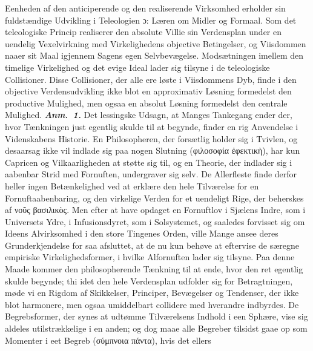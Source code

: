 \documentclass[12pt]{book}
\newcommand{\anm}[1]{\emph{\textbf{Anm.~#1.}}}
\newcommand{\dsi}{\textup{ɔ:}}
\newcommand{\opage}[1]{\marginnote{\footnotesize\textit{[#1]}}}
\begin{document}
Eenheden af den anticiperende og den realiserende Virksomhed erholder sin fuldstændige
Udvikling i Teleologien \dsi{} Læren om Midler og Formaal. Som det teleologiske Princip
realiserer den absolute Villie sin Verdensplan under en uendelig Vexelvirkning med
Virkelighedens objective Betingelser, og Viisdommen naaer sit Maal igjennem Sagens egen
Selvbevægelse. Modsætningen imellem den timelige Virkelighed og det evige Ideal lader sig
tilsyne i de teleologiske Collisioner. Disse Collisioner, der alle ere løste i Viisdommens
Dyb, finde i den objective Verdensudvikling ikke blot en approximativ Løsning formedelst den
productive Mulighed, men ogsaa en absolut Løsning formedelst den centrale Mulighed.
\opage{226} \anm{1} Det lessingske Udsagn, at Manges Tankegang ender der, hvor Tænkningen just egentlig
skulde til at begynde, finder en rig Anvendelse i Videnskabens Historie. En Philosopheren,
der forsætlig holder sig i Tvivlen, og desaarsag ikke vil indlade sig paa nogen Slutning
(φιλοσοφία ἐφεκτικὴ), har kun Capricen og Vilkaarligheden at støtte sig til, og en Theorie,
der indlader sig i aabenbar Strid med Fornuften, undergraver sig selv. De Allerfleste finde
derfor heller ingen Betænkelighed ved at erklære den hele Tilværelse for en
Fornuftaabenbaring, og den virkelige Verden for et uendeligt Rige, der beherskes af νοῦς
βασιλικὸς. Men efter at have opdaget en Fornuftlov i Sjælens Indre, som i Universets Ydre, i
Infusionsdyret, som i Solsystemet, og saaledes forvisset sig om Ideens Alvirksomhed i den
store Tingenes Orden, ville Mange ansee deres Grunderkjendelse for saa afsluttet, at de nu
kun behøve at eftervise de særegne empiriske Virkelighedsformer, i hvilke Alfornuften lader
sig tilsyne. Paa denne Maade kommer den philosopherende Tænkning til at ende, hvor den ret
egentlig skulde begynde; thi idet den hele Verdensplan udfolder sig for Betragtningen, møde
vi en Rigdom af Skikkelser, Principer, Bevægelser og Tendenser, der ikke blot harmonere, men
ogsaa umiddelbart collidere med hverandre indbyrdes. De Begrebsformer, der synes at udtømme
Tilværelsens Indhold i een Sphære, vise sig aldeles utilstrækkelige i en anden; og dog maae
alle Begreber tilsidst gaae op som Momenter i eet Begreb (σύμπνοια πάντα), hvis det ellers
\end{document}
